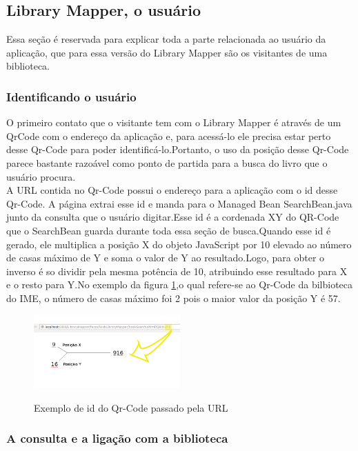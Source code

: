 \documentclass[a4paper,10pt]{article}
\begin{document}
   \subsection{Library Mapper, o usuário}
	Essa seção é reservada para explicar toda a parte relacionada ao usuário da aplicação, que para essa versão do Library Mapper são os visitantes de uma biblioteca.
		
	\subsubsection{Identificando o usuário}
		O primeiro contato que o visitante tem com o Library Mapper é através de um QrCode com o endereço da aplicação e, para
	acessá-lo ele precisa estar perto desse Qr-Code para poder identificá-lo.Portanto, o uso da posição desse Qr-Code parece bastante
	razoável como ponto de partida para a busca do livro que o usuário procura.\\

		A URL contida no Qr-Code possui o endereço para a aplicação com o id desse Qr-Code. A página extrai esse id e manda para o 
	Managed Bean SearchBean.java junto da consulta que o usuário digitar.Esse id é a cordenada XY do QR-Code 
	que o SearchBean guarda durante toda essa seção de busca.Quando esse id é gerado, ele multiplica a posição X do objeto 
	JavaScript por 10 elevado ao número de casas máximo de Y e soma o valor de Y ao resultado.Logo, para obter o inverso é so dividir
	pela mesma potência de 10, atribuindo esse resultado para X e o resto para Y.No exemplo da figura \ref{url},o qual refere-se
	ao Qr-Code da bilbioteca do IME, o número de casas máximo foi 2 pois o maior valor da posição Y é 57.\\
	
	

		\begin{figure}[H]
	\centering
	\includegraphics[width=0.50\textwidth]{./imgs/url.png}\\[1cm]   
	\caption{Exemplo de id do Qr-Code passado pela URL}
	\label{url}
\end{figure}
	
	\subsubsection{A consulta e a ligação com a biblioteca}
\end{document}
